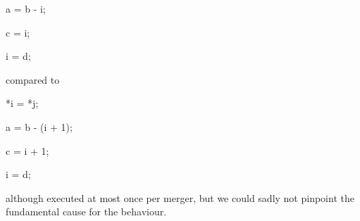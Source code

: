 \begin{itemize}
{\begin{minipage}{10cm}
\begin{minipage}{ \widthof{\ttfamily a = b - i;} }
				a = b - i;

				c = i;

				i = d;
			\end{minipage}
			\begin{minipage}{ \widthof{\quad compared to\quad} }
				\quad compared to\quad
			\end{minipage}
			\begin{minipage}{ \widthof{\ttfamily a = b - (i + 1);} }
				\ttfamily
				*i = *j;

				a = b - (i + 1);

				c = i + 1;

				i = d;
			\end{minipage}
		\end{minipage}
		\vspace{\baselineskip}
		\par
	}
	although executed at most once per merger, but we could sadly not pinpoint the fundamental cause for the behaviour.
\end{itemize}
